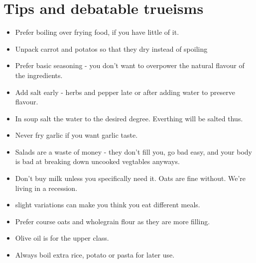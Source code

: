 \section{Tips and debatable trueisms}{

  \begin{itemize}
    \item Prefer boiling over frying food, if you have little of it.
    \item Unpack carrot and potatos so that they dry instead of spoiling
    \item Prefer basic seasoning - you don't want to overpower the
      natural flavour
      of the ingredients.
    \item Add salt early - herbs and pepper late or after adding
      water to preserve flavour.
    \item In soup salt the water to the desired degree. Everthing will be salted
      thus.
    \item Never fry garlic if you want garlic taste.
    \item Salads are a waste of money - they don't fill you, go bad easy, and
      your body is bad at breaking down uncooked vegtables anyways.
    \item Don't buy milk unless you specifically need it. Oats
      are fine without. We're living in a recession.
    \item slight variations can make you think you eat different meals.
    \item Prefer course oats and wholegrain flour as they are more filling.
    \item Olive oil is for the upper class.
    \item Always boil extra rice, potato or pasta for later use.
  \end{itemize}

  \clearpage
}

